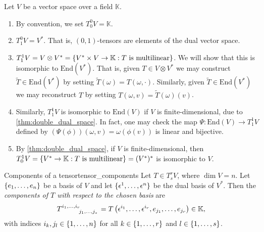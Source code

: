\begin{example}
    Let \(V\) be a vector space over a field \(\mathbb{K}\).
    \begin{enumerate}[label=(\alph*)]
        \item By convention, we set \(T_0^0 V = \mathbb{K}\).
        \item \(T_1^0V = V^\ast\). That is, \((0,1)\)-tensors are elements of the dual vector space.
        \item \(T_1^1V = V \otimes V^\ast = \{V^\ast \times V \to \mathbb{K} : T\text{ is multilinear}\}\). We will show that this is isomorphic to \(\mathrm{End}(V^\ast)\). That is, given \(T \in V \otimes V^\ast\) we may construct \(\tilde{T} \in \mathrm{End}(V^\ast)\) by setting \(\tilde{T}(\omega) = T(\omega, \cdot)\). Similarly, given \(\tilde{T} \in \mathrm{End}(V^\ast)\) we may reconstruct \(T\) by setting \(T(\omega, v) = \tilde{T}(\omega)(v)\).
        \item Similarly, \(T_1^1V\) is isomorphic to \(\mathrm{End}(V)\) if \(V\) is finite-dimensional, due to \cref{thm:double_dual_space}. In fact, one may check the map \(\Psi : \mathrm{End}(V) \to T_1^1 V\) defined by \((\Psi(\phi))(\omega, v) = \omega(\phi(v))\) is linear and bijective.
        \item By \cref{thm:double_dual_space}, if \(V\) is finite-dimensional, then \(T_0^1 V = \{V ^{\ast} \to \mathbb{K} : T \text{ is multilinear}\} = (V ^{\ast})^{\ast}\) is isomorphic to \(V\).
    \end{enumerate}
\end{example}

\begin{definition}{Components of a tensor}{tensor_components}
    Let \(T\in T_s^r V\), where \(\dim V = n\). Let \(\{e_1, \dots, e_n\}\) be a basis of \(V\) and let \(\{\epsilon^1, \dots, \epsilon^n\}\) be the dual basis of \(V ^{\ast}\). Then the \emph{components of \(T\) with respect to the chosen basis} are
    \begin{equation*}
        T\indices{^{i_1, \dots, i_r}_{j_1, \dots, j_s}} = T\left(\epsilon^{i_1}, \dots, \epsilon^{i_r}, e_{j_1}, \dots, e_{j_r}\right) \in \mathbb{K},
    \end{equation*}
    with indices \(i_k, j_l \in \{1, \dots, n\}\) for all \(k \in \{1, \dots, r\}\) and \(l \in \{1, \dots, s\}\).
\end{definition}

